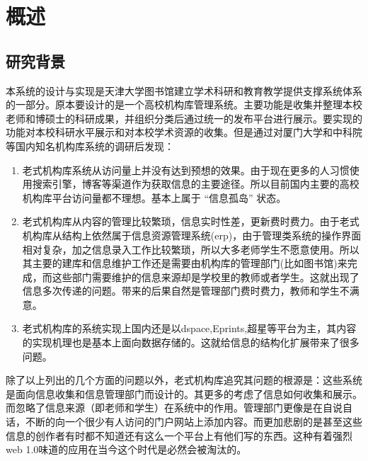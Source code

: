 
\chapter{概述}
\label{chap:intro}

\section{研究背景}
\label{sec:dongji}

本系统的设计与实现是天津大学图书馆建立学术科研和教育教学提供支撑系统体系的一部分。原本要设计的是一个高校机构库管理系统。主要功能是收集并整理本校老师和博硕士的科研成果，并组织分类后通过统一的发布平台进行展示。要实现的功能对本校科研水平展示和对本校学术资源的收集。但是通过对厦门大学和中科院等国内知名机构库系统的调研后发现：
\begin{enumerate}
\item 老式机构库系统从访问量上并没有达到预想的效果。由于现在更多的人习惯使用搜索引擎，博客等渠道作为获取信息的主要途径。所以目前国内主要的高校机构库平台访问量都不理想。基本上属于 “信息孤岛” 状态。
\item 老式机构库从内容的管理比较繁琐，信息实时性差，更新费时费力。由于老式机构库从结构上依然属于信息资源管理系统(erp)，由于管理类系统的操作界面相对复杂，加之信息录入工作比较繁琐，所以大多老师学生不愿意使用。所以其主要的建库和信息维护工作还是需要由机构库的管理部门(比如图书馆)来完成，而这些部门需要维护的信息来源却是学校里的教师或者学生。这就出现了信息多次传递的问题。带来的后果自然是管理部门费时费力，教师和学生不满意。
\item 老式机构库的系统实现上国内还是以dspace,Eprints,超星等平台为主，其内容的实现机理也是基本上面向数据存储的。这就给信息的结构化扩展带来了很多问题。
\end{enumerate}
除了以上列出的几个方面的问题以外，老式机构库追究其问题的根源是：这些系统是面向信息收集和信息管理部门而设计的。其更多的考虑了信息如何收集和展示。而忽略了信息来源（即老师和学生）在系统中的作用。管理部门更像是在自说自话，不断的向一个很少有人访问的门户网站上添加内容。而更加悲剧的是甚至这些信息的创作者有时都不知道还有这么一个平台上有他们写的东西。这种有着强烈web 1.0味道的应用在当今这个时代是必然会被淘汰的。

